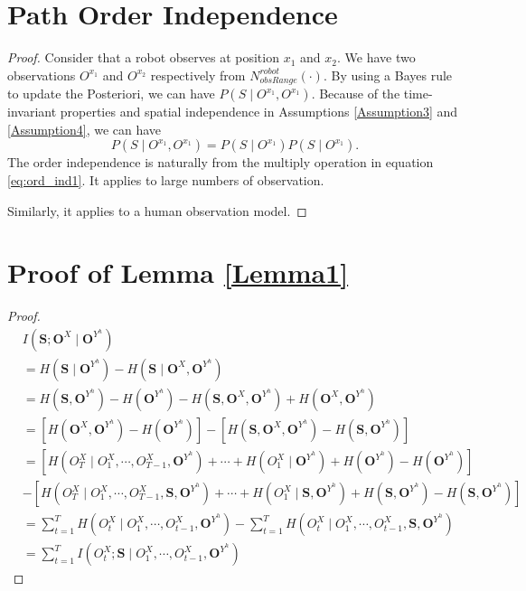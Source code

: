 \appendix

\section{Path Order Independence}
\label{app:order_independence}
\begin{proof}

Consider that a robot observes at position $ x_{1} $ and $ x_{2} $.
We have two observations $ O^{x_{1}} $ and $ O^{x_{2}} $ respectively from $ N^{robot}_{obsRange}( \cdot ) $.
By using a Bayes rule to update the Posteriori, we can have $ P(S \mid O^{x_{1}} , O^{x_{1}} ) $.
Because of the time-invariant properties and spatial independence in Assumptions \ref{Assumption3} and \ref{Assumption4}, we can have
\begin{equation}
\label{eq:ord_ind1}
P(S \mid O^{x_{1}} , O^{x_{1}} ) = P(S \mid O^{x_{1}} ) P(S \mid O^{x_{1}} ).
\end{equation}
The order independence is naturally from the multiply operation in equation \eqref{eq:ord_ind1}.
It applies to large numbers of observation.

Similarly, it applies to a human observation model.
\end{proof}

\section{Proof of Lemma \ref{Lemma1}}
\label{app:Lemma1}
\begin{proof}
\begin{equation}
\begin{aligned}
& I(\mathbf{S}; \mathbf{O}^{X} \mid \mathbf{O}^{Y^{h}}) \\
& = H(\mathbf{S} \mid \mathbf{O}^{Y^{h}}) - H(\mathbf{S} \mid \mathbf{O}^{X} , \mathbf{O}^{Y^{h}}) \\
& = H(\mathbf{S} , \mathbf{O}^{Y^{h}}) - H(\mathbf{O}^{Y^{h}}) - H(\mathbf{S} , \mathbf{O}^{X} , \mathbf{O}^{Y^{h}}) 
+ H(\mathbf{O}^{X} , \mathbf{O}^{Y^{h}}) \\
& = [ H(\mathbf{O}^{X} , \mathbf{O}^{Y^{h}}) - H(\mathbf{O}^{Y^{h}}) ] - [ H(\mathbf{S} , \mathbf{O}^{X} , \mathbf{O}^{Y^{h}}) - H(\mathbf{S} , \mathbf{O}^{Y^{h}}) ] \\
& = [H(O_{T}^{X} \mid O_{1}^{X} , \cdots , O_{T-1}^{X}, \mathbf{O}^{Y^{h}}) + \cdots + H(O_{1}^{X} \mid \mathbf{O}^{Y^{h}}) + H(\mathbf{O}^{Y^{h}}) - H(\mathbf{O}^{Y^{h}}) ] \\
& - [H(O_{T}^{X} \mid O_{1}^{X} , \cdots , O_{T-1}^{X}, \mathbf{S}, \mathbf{O}^{Y^{h}}) + \cdots + H(O_{1}^{X} \mid \mathbf{S}, \mathbf{O}^{Y^{h}}) + H(\mathbf{S} , \mathbf{O}^{Y^{h}}) - H(\mathbf{S} , \mathbf{O}^{Y^{h}})] \\
& = \sum_{t=1}^{T} H(O_{t}^{X} \mid O_{1}^{X} , \cdots , O_{t-1}^{X}, \mathbf{O}^{Y^{h}}) - \sum_{t=1}^{T} H(O_{t}^{X} \mid O_{1}^{X} , \cdots , O_{t-1}^{X}, \mathbf{S}, \mathbf{O}^{Y^{h}}) \\
& = \sum_{t=1}^{T} I(O^{X}_{t} ; \mathbf{S} \mid O^{X}_{1} , \cdots , O^{X}_{t-1}, \mathbf{O}^{Y^{h}})
\end{aligned}
\end{equation}
\end{proof}

